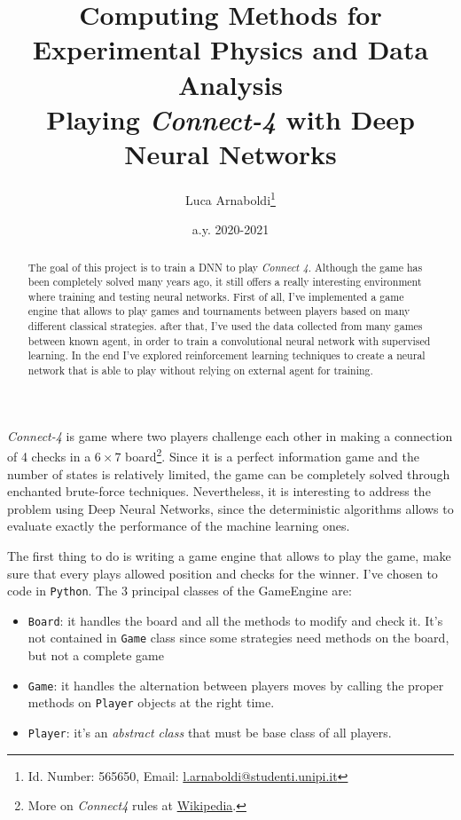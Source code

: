 \documentclass{article}
\title{
  {\normalsize Computing Methods for Experimental Physics and Data Analysis}\\
  Playing \emph{Connect-4} with Deep Neural Networks
}
\author{Luca Arnaboldi\footnote{Id. Number: 565650, Email: \href{mailto:l.arnaboldi@studenti.unipi.it}{l.arnaboldi@studenti.unipi.it}}}
\date{a.y. 2020-2021}
\newcommand{\ipy}[1]{\texttt{#1}}
\begin{document}
  \maketitle
  \begin{abstract}
    The goal of this project is to train a DNN to play \emph{Connect 4}. Although the game has been completely solved many years ago, it still offers a really interesting environment where training and testing neural networks. First of all, I've implemented a game engine that allows to play games and tournaments between players based on many different classical strategies. after that, I've used the data collected from many games between known agent, in order to train a convolutional neural network with supervised learning. In the end I've explored reinforcement learning techniques to create a neural network that is able to play without relying on external agent for training. 
  \end{abstract}
  
  \emph{Connect-4} is game where two players challenge each other in making a connection of 4 checks in a \(6\times7\) board\footnote{More on \emph{Connect4} rules at \href{https://en.wikipedia.org/wiki/Connect_Four}{Wikipedia}.}. 
  Since it is a perfect information game and the number of states is relatively limited, the game can be completely solved through enchanted brute-force techniques. Nevertheless, it is interesting to address the problem using Deep Neural Networks, since the deterministic algorithms allows to evaluate exactly the performance of the machine learning ones.
  
  The first thing to do is writing a game engine that allows to play the game, make sure that every plays allowed position and checks for the winner. I've chosen to code in \texttt{Python}. The 3 principal classes of the GameEngine are:
  \begin{itemize}
    \item \ipy{Board}: it handles the board and all the methods to modify and check it. It's not contained in \ipy{Game} class since some strategies need methods on the board, but not a complete game 
    \item \ipy{Game}: it handles the alternation between players moves by calling the proper methods on \ipy{Player} objects at the right time. 
    \item \ipy{Player}: it's an \emph{abstract class} that must be base class of all players.
  \end{itemize}
\end{document}

